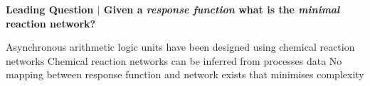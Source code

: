 \documentclass[a0,portrait]{a0poster}
\begin{document}


\vspace{-9cm}
\begin{tcolorbox}[boxrule=2pt,arc=3.4pt,boxsep=2mm]
	\begin{center}
		\textbf{\color{Grey}Leading Question \color{Black}$|$
		Given a \textit{response function} what is the \textit{minimal} reaction network?}
	\end{center}
\end{tcolorbox}

\begin{itemize}[leftmargin=3cm]
	\up Asynchronous arithmetic logic units have been designed using chemical reaction networks \cite{Cardelli2018ChemicalCircuits.}
	\up Chemical reaction networks can be inferred from processes
	data \cite{Galagali2016BayesianNetworks}
	\down No mapping between response function and network exists that minimises complexity
\end{itemize}
\end{document}
